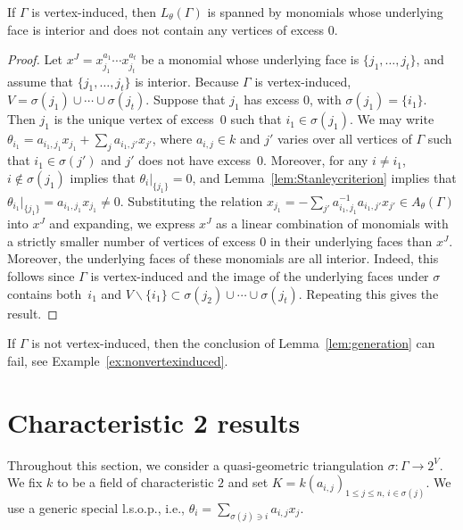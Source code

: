\begin{lemm}\label{lem:generation}
	If $\Gamma$ is vertex-induced, then $L_\theta(\Gamma)$ is spanned by monomials whose underlying face is interior and does not contain any vertices of excess $0$. 
\end{lemm}

\begin{proof}
	Let $x^J = x_{j_1}^{a_1} \dotsb x_{j_t}^{a_t}$ be a monomial whose underlying face is $\{j_1, \dotsc, j_t\}$, and assume that $\{j_1, \dotsc, j_t\}$ is interior. Because $\Gamma$ is vertex-induced, $V = \sigma(j_1) \cup \dotsb \cup \sigma(j_t)$. Suppose that $j_1$ has excess $0$, with $\sigma(j_1) = \{i_1\}$. Then $j_1$ is the unique vertex of excess~$0$ such that $i_1 \in \sigma(j_1)$. 
	We may write $\theta_{i_1} = a_{i_1,j_1} x_{j_1} + \sum_{j} a_{i_1,j'} x_{j'}$, where \mbox{$a_{i,j} \in k$} and  $j'$ varies over all vertices of $\Gamma$ such that $i_1 \in \sigma(j')$ and $j'$ does not have excess~$0$. 
	Moreover, for any $i \neq i_1$, $i \notin \sigma(j_1)$ implies that $\theta_i|_{\{j_1\}} = 0$, and Lemma~\ref{lem:Stanleycriterion} implies that $\theta_{i_1}|_{\{j_1\}} = a_{i_1,j_1} x_{j_1} \neq 0$.
	Substituting the relation 
	$x_{j_1} = -\sum_{j'} a_{i_1,j_1}^{-1}a_{i_1,j'} x_{j'} \in
	 A_{\theta}(\Gamma)$
	into $x^J$ and expanding, we express $x^J$ as a linear combination of monomials 
	with a strictly smaller number of vertices of excess $0$ in their underlying faces than $x^J$. Moreover, 
	the underlying faces of these monomials are all interior. Indeed, this follows since $\Gamma$ is vertex-induced and
	the image of the underlying faces under $\sigma$ contains both~$i_1$ and
	$V \smallsetminus \{ i_1 \} \subset \sigma(j_2) \cup \dotsb \cup \sigma(j_t)$. 
	Repeating this gives the result.
\end{proof}

\begin{rema}
	If $\Gamma$ is not vertex-induced, then the conclusion of Lemma~\ref{lem:generation} can fail, see Example~\ref{ex:nonvertexinduced}.
\end{rema}

\section{Characteristic 2 results}

Throughout this section, we consider a quasi-geometric triangulation $\sigma \colon \Gamma \to 2^V$. 
We fix $k$ to be a field of characteristic $2$ and set $K = k(a_{i,j})_{1 \le j \le n, \, i \in \sigma(j)}$. We use a generic special l.s.o.p., i.e., $\theta_i = \sum_{\sigma(j) \ni i} a_{i,j} x_j$. 

